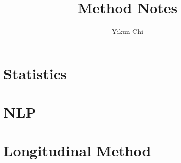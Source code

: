 \documentclass{book}
\title{Method Notes}
\author{Yikun Chi}
\begin{document}
\maketitle
\tableofcontents 

\part{Statistics}


\part{NLP}



\part{Longitudinal Method}

\end{document}
